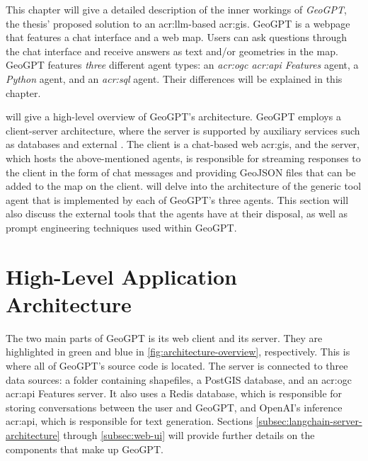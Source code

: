 \vspace{12pt}

This chapter will give a detailed description of the inner workings of \textit{GeoGPT}, the thesis' proposed solution to an \acrshort{acr:llm}-based \acrshort{acr:gis}. GeoGPT is a webpage that features a chat interface and a web map. Users can ask questions through the chat interface and receive answers as text and/or geometries in the map. GeoGPT features \textit{three} different agent types: an \textit{\acrshort{acr:ogc} \acrshort{acr:api} Features} agent, a \textit{Python} agent, and an \textit{\acrshort{acr:sql}} agent. Their differences will be explained in this chapter.

 will give a high-level overview of GeoGPT's architecture. GeoGPT employs a client-server architecture, where the server is supported by auxiliary services such as databases and external . The client is a chat-based web \acrshort{acr:gis}, and the server, which hosts the above-mentioned agents, is responsible for streaming responses to the client in the form of chat messages and providing GeoJSON files that can be added to the map on the client.  will delve into the architecture of the generic tool agent that is implemented by each of GeoGPT's three agents. This section will also discuss the external tools that the agents have at their disposal, as well as prompt engineering techniques used within GeoGPT.

\section{High-Level Application Architecture}
\label{sec:high-level-application-architecture}

The two main parts of GeoGPT is its web client and its server. They are highlighted in green and blue in \autoref{fig:architecture-overview}, respectively. This is where all of GeoGPT's source code is located. The server is connected to three data sources: a folder containing shapefiles, a PostGIS database, and an \acrshort{acr:ogc} \acrshort{acr:api} Features server. It also uses a Redis database, which is responsible for storing conversations between the user and GeoGPT, and OpenAI's inference \acrshort{acr:api}, which is responsible for text generation. Sections \ref{subsec:langchain-server-architecture} through \ref{subsec:web-ui} will provide further details on the components that make up GeoGPT.

